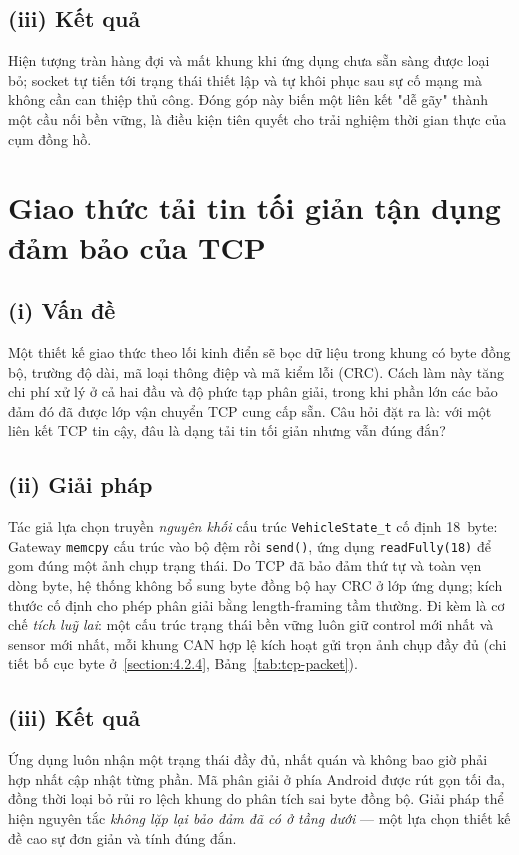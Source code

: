 \documentclass[../DoAn.tex]{subfiles}
\begin{document}
\subsection*{(iii) Kết quả}
Hiện tượng tràn hàng đợi và mất khung khi ứng dụng chưa sẵn sàng được loại bỏ;
socket tự tiến tới trạng thái thiết lập và tự khôi phục sau sự cố mạng mà không
cần can thiệp thủ công. Đóng góp này biến một liên kết "dễ gãy" thành một cầu nối
bền vững, là điều kiện tiên quyết cho trải nghiệm thời gian thực của cụm đồng hồ.

\section{Giao thức tải tin tối giản tận dụng đảm bảo của TCP}
\label{section:5.2}

\subsection*{(i) Vấn đề}
Một thiết kế giao thức theo lối kinh điển sẽ bọc dữ liệu trong khung có byte đồng
bộ, trường độ dài, mã loại thông điệp và mã kiểm lỗi (CRC). Cách làm này tăng chi
phí xử lý ở cả hai đầu và độ phức tạp phân giải, trong khi phần lớn các bảo đảm đó
đã được lớp vận chuyển TCP cung cấp sẵn. Câu hỏi đặt ra là: với một liên kết
TCP tin cậy, đâu là dạng tải tin tối giản nhưng vẫn đúng đắn?

\subsection*{(ii) Giải pháp}
Tác giả lựa chọn truyền \emph{nguyên khối} cấu trúc \texttt{VehicleState\_t} cố
định 18~byte: Gateway \texttt{memcpy} cấu trúc vào bộ đệm rồi \texttt{send()},
ứng dụng \texttt{readFully(18)} để gom đúng một ảnh chụp trạng thái. Do TCP đã bảo
đảm thứ tự và toàn vẹn dòng byte, hệ thống không bổ sung byte đồng bộ hay CRC ở
lớp ứng dụng; kích thước cố định cho phép phân giải bằng length-framing tầm
thường. Đi kèm là cơ chế \emph{tích luỹ lai}: một cấu trúc trạng thái bền vững
luôn giữ control mới nhất và sensor mới nhất, mỗi khung CAN hợp lệ kích hoạt gửi
trọn ảnh chụp đầy đủ (chi tiết bố cục byte ở~\ref{section:4.2.4},
Bảng~\ref{tab:tcp-packet}).

\subsection*{(iii) Kết quả}
Ứng dụng luôn nhận một trạng thái đầy đủ, nhất quán và không bao giờ phải hợp nhất
cập nhật từng phần. Mã phân giải ở phía Android được rút gọn tối đa, đồng thời
loại bỏ rủi ro lệch khung do phân tích sai byte đồng bộ. Giải pháp thể hiện
nguyên tắc \emph{không lặp lại bảo đảm đã có ở tầng dưới} — một lựa chọn thiết kế
đề cao sự đơn giản và tính đúng đắn.
\end{document}
